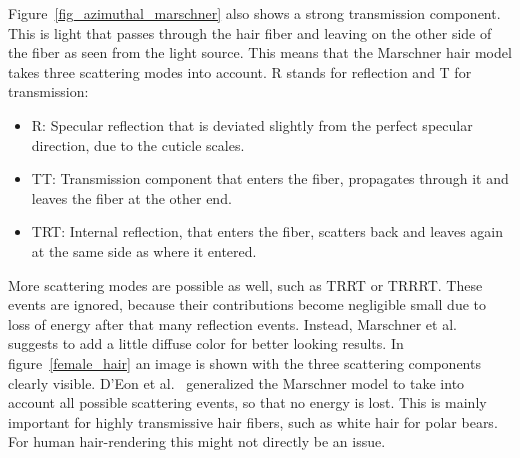\documentclass[11pt,a4paper]{report}
\begin{document}
Figure~\ref{fig_azimuthal_marschner} also shows a strong transmission component. This is light that passes through the hair fiber and leaving on the other side of the fiber as seen from the light source. This means that the Marschner hair model takes three scattering modes into account. R stands for reflection and T for transmission:

\begin{itemize}
\item R: Specular reflection that is deviated slightly from the perfect specular direction, due to the cuticle scales.
\item TT: Transmission component that enters the fiber, propagates through it and leaves the fiber at the other end.
\item TRT: Internal reflection, that enters the fiber, scatters back and leaves again at the same side as where it entered.
\end{itemize}

More scattering modes are possible as well, such as TRRT or TRRRT. These events are ignored, because their contributions become negligible small due to loss of energy after that many reflection events. Instead, Marschner et al.~\cite{marschner} suggests to add a little diffuse color for better looking results. In figure~\ref{female_hair} an image is shown with the three scattering components clearly visible. D'Eon et al.~\cite{eon2011} generalized the Marschner model to take into account all possible scattering events, so that no energy is lost. This is mainly important for highly transmissive hair fibers, such as white hair for polar bears. For human hair-rendering this might not directly be an issue.
\end{document}
